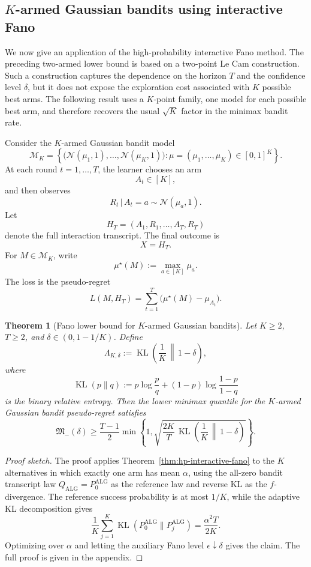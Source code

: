 \documentclass[journal]{IEEEtran}
\newtheorem{theorem}{Theorem}
\newcommand{\ALG}{\mathrm{ALG}}
\newcommand{\KL}{\operatorname{KL}}
\begin{document}
\subsection{\(K\)-armed Gaussian bandits using interactive Fano}
\label{sec:karmed-fano-bandit}

We now give an application of the high-probability
interactive Fano method. The preceding two-armed lower bound is based on a
two-point Le Cam construction. Such a construction captures the dependence on
the horizon \(T\) and the confidence level \(\delta\), but it does not expose
the exploration cost associated with \(K\) possible best arms. The following
result uses a \(K\)-point family, one model for each possible best arm, and
therefore recovers the usual \(\sqrt{K}\) factor in the minimax bandit rate.

Consider the \(K\)-armed Gaussian bandit model
\[
\mathcal M_K
=
\left\{
\bigl(\mathcal N(\mu_1,1),\dots,\mathcal N(\mu_K,1)\bigr):
\mu=(\mu_1,\dots,\mu_K)\in[0,1]^K
\right\}.
\]
At each round \(t=1,\dots,T\), the learner chooses an arm
\[
A_t\in[K],
\]
and then observes
\[
R_t\,|\,A_t=a \sim \mathcal N(\mu_a,1).
\]
Let
\[
H_T=(A_1,R_1,\dots,A_T,R_T)
\]
denote the full interaction transcript. The final outcome is
\[
X=H_T.
\]
For \(M\in\mathcal M_K\), write
\[
\mu^\star(M):=\max_{a\in[K]}\mu_a.
\]
The loss is the pseudo-regret
\[
L(M,H_T)
=
\sum_{t=1}^T
\bigl(\mu^\star(M)-\mu_{A_t}\bigr).
\]

\begin{theorem}[Fano lower bound for \(K\)-armed Gaussian bandits]
\label{thm:karmed-fano-bandit}
Let \(K\ge 2\), \(T\ge 2\), and \(\delta\in(0,1-1/K)\). Define
\[
\Lambda_{K,\delta}
:=
\KL\left(\frac1K\,\middle\|\,1-\delta\right),
\]
where
\[
\KL(p\|q)
:=
p\log\frac{p}{q}
+
(1-p)\log\frac{1-p}{1-q}
\]
is the binary relative entropy. Then the lower minimax quantile for the
\(K\)-armed Gaussian bandit pseudo-regret satisfies
\[
\mathfrak M_-(\delta)
\ge
\frac{T-1}{2}
\min\left\{
1,
\sqrt{
\frac{2K}{T}
\,
\KL\left(\frac1K\,\middle\|\,1-\delta\right)
}
\right\}.
\]
\end{theorem}
\begin{proof}[Proof sketch]
The proof applies Theorem~\ref{thm:hp-interactive-fano} to the \(K\) alternatives
in which exactly one arm has mean \(\alpha\), using the all-zero bandit
transcript law \(Q_\ALG=P_0^\ALG\) as the reference law and reverse KL as the
\(f\)-divergence. The reference success probability is at most \(1/K\), while
the adaptive KL decomposition gives
\[
\frac1K\sum_{j=1}^K \KL(P_0^\ALG\|P_j^\ALG)
=
\frac{\alpha^2T}{2K}.
\]
Optimizing over \(\alpha\) and letting the auxiliary Fano level
\(\epsilon\downarrow\delta\) gives the claim. The full proof is given in the appendix.
\end{proof}
\end{document}
